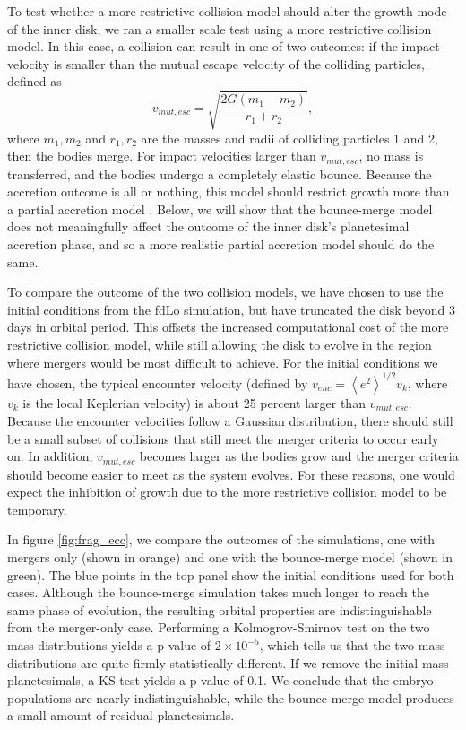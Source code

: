 To test whether a more restrictive collision model should alter the growth mode of the inner disk, we ran a smaller scale test 
using a more restrictive collision model. In this case, a collision can result in one of two outcomes: if the impact velocity is 
smaller than the mutual escape velocity of the colliding particles, defined as
\begin{equation}\label{eq:v_mut}
	v_{mut, esc} = \sqrt{\frac{2 G (m_{1} + m_{2})}{r_{1} + r_{2}}},
\end{equation}
where $m_{1}, m_{2}$ and $r_{1}, r_{2}$ are the masses and radii of
colliding particles 1 and 2, then the bodies merge. For
impact velocities larger than $v_{mut, esc}$, no mass is transferred, and the bodies undergo a completely elastic bounce. 
Because the accretion outcome is all or nothing, this model should restrict growth more than a partial accretion model 
\cite{leinhardt12}. Below, we will show that the bounce-merge model does not meaningfully affect the outcome of the inner 
disk's planetesimal accretion phase, and so a more realistic partial accretion model should do the same.

To compare the outcome of the two collision models, we have chosen to use the initial conditions from the fdLo simulation, but 
have truncated the disk beyond 3 days in orbital period. This offsets the increased computational cost of the more restrictive collision model, while still allowing the disk to evolve in the region where mergers would be most difficult to achieve.
For the initial conditions we have chosen, the typical encounter velocity (defined by $v_{enc} = \left< e^{2} \right>^{1/2} v_{k}$, 
where $v_{k}$ is the local Keplerian velocity) is about 25 percent larger than $v_{mut, esc}$. Because the encounter velocities 
follow a Gaussian distribution, there should still be a small subset of collisions that still meet the merger criteria to occur early on. 
In addition, $v_{mut, esc}$ becomes larger as the bodies grow and the merger criteria should become easier to meet as the 
system evolves. For these reasons, one would expect the inhibition of growth due to the more restrictive collision model to be 
temporary.

In figure \ref{fig:frag_ecc}, we compare the outcomes of the simulations, one with mergers only (shown in orange) and one with 
the bounce-merge model (shown in green). The blue points in the top panel show the initial conditions used for both cases. 
Although the bounce-merge simulation takes much longer to reach the same phase of evolution, the resulting orbital properties
are indistinguishable from the merger-only case. Performing a Kolmogrov-Smirnov test on the two mass distributions yields
a p-value of $2 \times 10^{-5}$, which tells us that the two mass distributions are quite firmly statistically different. If we remove
the initial mass planetesimals, a KS test yields a p-value of 0.1. We conclude that the embryo populations are nearly indistinguishable,
while the bounce-merge model produces a small amount of residual planetesimals.

